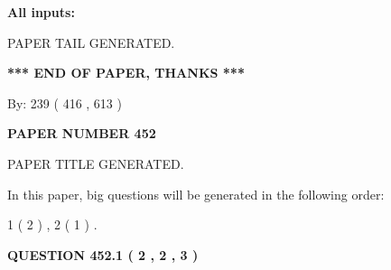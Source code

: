 \documentclass{ctexart}
\begin{document}
   
   
   
\noindent{}
   
   
   
   
\noindent\vspace{0.1in}\hspace{-0.08in} {\textbf{\Large{All inputs: }}}
   
   
   
   
   
   
 \vspace{0.2in}
 
   
   
\vspace{2.0in} PAPER TAIL GENERATED.
   
   
   
   
\vspace{1.0in} 
{\textbf{\large{ *** END OF PAPER, THANKS *** }}} 
   
   
\hspace{1.0in} By: 
 239 ( 416 ,  613 )
   
   
   
   
\newpage 
\setcounter{page}{ 
   452001 } 
   
   
   
   
 {\textbf{ \Large{ PAPER NUMBER  452  }}}
   
   
\vspace{0.2in}
   
   
   
   
   
   
   
   
 \vspace{0.2in}
 
 
 
 
   
   
 PAPER TITLE GENERATED.
   
   
   
\vspace{0.2in}
   
In this paper, big questions will be generated in the following order: 
   
   
   1 ( 2 )
 ,
   2 ( 1 )
 .
  
\vspace{0.2in}
  
{\textbf{\Large{QUESTION
452.1 
 ( 2 , 2 , 3 )
}}}
  
\end{document}
